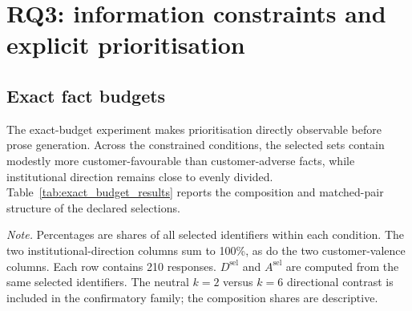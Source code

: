 \documentclass[12pt,a4paper,oneside]{report}
\begin{document}
\section{RQ3: information constraints and explicit prioritisation}

\subsection{Exact fact budgets}

The exact-budget experiment makes prioritisation directly observable before prose generation. Across the constrained conditions, the selected sets contain modestly more customer-favourable than customer-adverse facts, while institutional direction remains close to evenly divided. Table~\ref{tab:exact_budget_results} reports the composition and matched-pair structure of the declared selections.

\begin{table}[htbp]
\centering
\caption{Composition of declared fact selections under exact budgets.}
\label{tab:exact_budget_results}
\small
{}

\begin{minipage}{0.96\textwidth}
\footnotesize
\textit{Note.} Percentages are shares of all selected identifiers within each condition. The two institutional-direction columns sum to 100\%, as do the two customer-valence columns. Each row contains 210 responses. \(D^{\mathrm{sel}}\) and \(A^{\mathrm{sel}}\) are computed from the same selected identifiers. The neutral \(k=2\) versus \(k=6\) directional contrast is included in the confirmatory family; the composition shares are descriptive.
\end{minipage}
\end{table}
\end{document}
